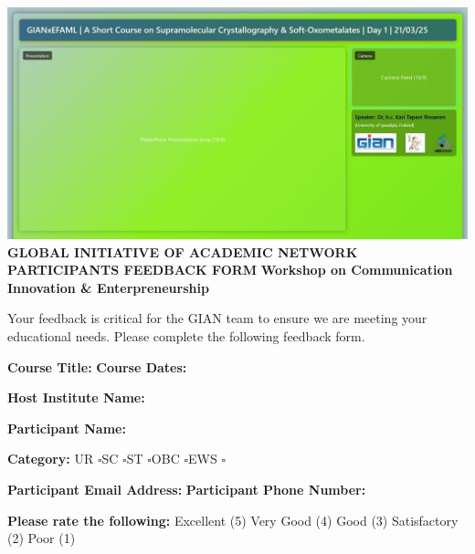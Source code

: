 \documentclass[10pt]{article}
\newcommand{\checkbox}{\ensuremath{\square}}
\begin{document}
\begin{center}
    \includegraphics[scale=0.3]{image.png}\\[0.3cm]
    {\large \textbf{GLOBAL INITIATIVE OF ACADEMIC NETWORK}}\\[0.5cm]
    {\normalsize \textbf{PARTICIPANTS FEEDBACK FORM}}
    {\large \textbf{Workshop on Communication Innovation \& Enterpreneurship}}
\end{center}

Your feedback is critical for the GIAN team to ensure we are meeting your educational needs. Please complete the following feedback form.

\vspace{0.3cm}
\textbf{Course Title:} \underline{\hspace{5cm}} \hfill \textbf{Course Dates:} \underline{\hspace{3cm}}

\vspace{0.3cm}
\textbf{Host Institute Name:} \underline{\hspace{10cm}}

\vspace{0.3cm}
\textbf{Participant Name:} \underline{\hspace{10cm}}

\vspace{0.3cm}
\textbf{Category:} \quad UR \checkbox \quad SC \checkbox \quad ST \checkbox \quad OBC \checkbox \quad EWS \checkbox

\vspace{0.5cm}
\textbf{Participant Email Address:} \underline{\hspace{5cm}} \hfill \textbf{Participant Phone Number:} \underline{\hspace{3cm}}

\vspace{0.3cm}
\textbf{Please rate the following:} \quad Excellent (5) \quad Very Good (4) \quad Good (3) \quad Satisfactory (2) \quad Poor (1)
\end{document}
